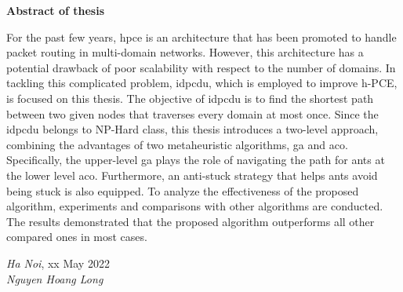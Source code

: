 \begin{center}
	{\fontsize{14}{16}\selectfont \textbf{Abstract of thesis}}
\end{center}

For the past few years, \gls{hpce} is an architecture that has been promoted to handle packet routing in multi-domain networks. However, this architecture has a potential drawback of poor scalability with
respect to the number of domains. In tackling this complicated problem, \acrfull{idpcdu}, which is employed to improve h-PCE, is focused on this thesis. The objective of \gls{idpcdu} is to find the shortest path between two given nodes that traverses every domain at most once. Since the \gls{idpcdu} belongs to NP-Hard class, this thesis introduces a two-level approach, combining the advantages of two metaheuristic algorithms, \acrfull{ga} and \acrfull{aco}. Specifically, the upper-level \gls{ga} plays the role of navigating the path for ants at the lower level \gls{aco}. Furthermore, an anti-stuck strategy that helps ants avoid being stuck is also equipped. To analyze the effectiveness of the proposed algorithm, experiments and comparisons with other algorithms are conducted. The results demonstrated that the proposed algorithm outperforms all other compared ones in most cases.

\begin{flushright}
	\begin{minipage}[t]{0.5\textwidth}
		\begin{center}
			\textit{Ha Noi}, xx May 2022\\[2cm]
		
			\textit{Nguyen Hoang Long}
		\end{center}
	\end{minipage}
\end{flushright}
\pagebreak